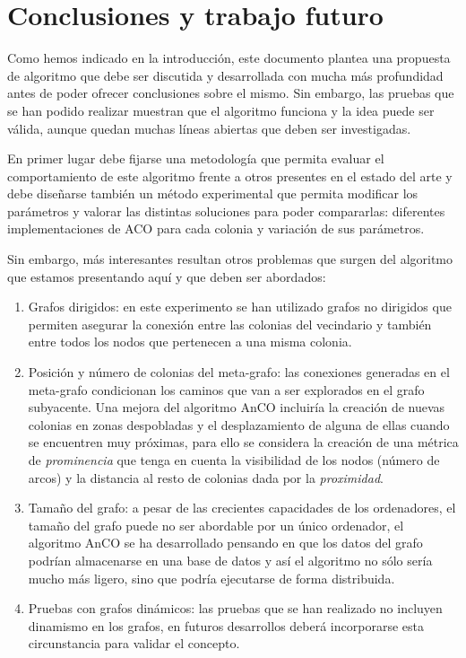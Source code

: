 \documentclass{llncs}
\begin{document}
\section{Conclusiones y trabajo futuro}
Como hemos indicado en la introducci{\'o}n, este documento plantea una propuesta de algoritmo que debe ser discutida y desarrollada con mucha m{\'a}s profundidad antes de poder ofrecer conclusiones sobre el mismo.
Sin embargo, las pruebas que se han podido realizar muestran que el algoritmo funciona y la idea puede ser v{\'a}lida, aunque quedan muchas l{\'i}neas abiertas que deben ser investigadas.

En primer lugar debe fijarse una metodolog{\'i}a que permita evaluar el comportamiento de este algoritmo frente a otros presentes en el estado del arte y debe dise\~{n}arse tambi{\'e}n un m{\'e}todo experimental que permita modificar los par{\'a}metros y valorar las distintas soluciones para poder compararlas: diferentes implementaciones de ACO para cada colonia y variaci{\'o}n de sus par{\'a}metros.

Sin embargo, m{\'a}s interesantes resultan otros problemas que surgen del algoritmo que estamos presentando aqu{\'i} y que deben ser abordados:
\begin{enumerate}
  \item Grafos dirigidos: en este experimento se han utilizado grafos no dirigidos que permiten asegurar la conexi{\'o}n entre las colonias del vecindario y tambi{\'e}n entre todos los nodos que pertenecen a una misma colonia.
  \item Posici{\'o}n y n{\'u}mero de colonias del meta-grafo: las conexiones generadas en el meta-grafo condicionan los caminos que van a ser explorados en el grafo subyacente. Una mejora del algoritmo AnCO incluir{\'i}a la creaci{\'o}n de nuevas colonias en zonas despobladas y el desplazamiento de alguna de ellas cuando se encuentren muy pr{\'o}ximas, para ello se considera la creaci{\'o}n de una m{\'e}trica de \textit{prominencia} que tenga en cuenta la visibilidad de los nodos (n{\'u}mero de arcos) y la distancia al resto de colonias dada por la \textit{proximidad}.
  \item Tama\~{n}o del grafo: a pesar de las crecientes capacidades de los ordenadores, el tama\~{n}o del grafo puede no ser abordable por un {\'u}nico ordenador, el algoritmo AnCO se ha desarrollado pensando en que los datos del grafo podr{\'i}an almacenarse en una base de datos \cite{Rivero2011} y as{\'i} el algoritmo no s{\'o}lo ser{\'i}a mucho m{\'a}s ligero, sino que podr{\'i}a ejecutarse de forma distribuida.
  \item Pruebas con grafos din{\'a}micos: las pruebas que se han realizado no incluyen dinamismo en los grafos, en futuros desarrollos deber{\'a} incorporarse esta circunstancia para validar el concepto.
\end{enumerate}
\end{document}
